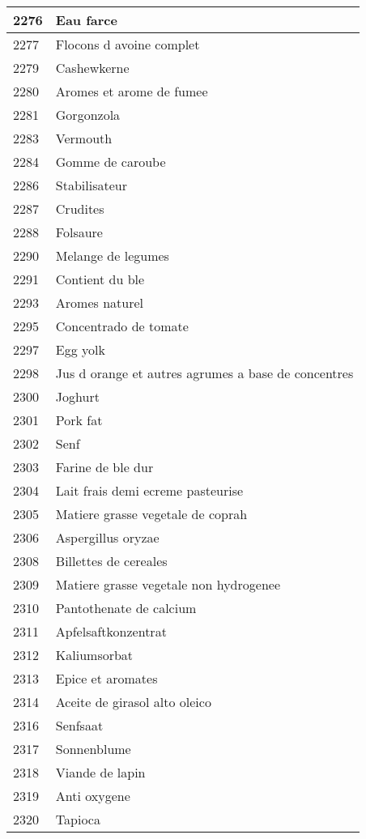 \begin{longtable}{|l|l|}
2276 & Eau farce \\ \hline 
2277 & Flocons d avoine complet \\ \hline 
2279 & Cashewkerne \\ \hline 
2280 & Aromes et arome de fumee \\ \hline 
2281 & Gorgonzola \\ \hline 
2283 & Vermouth \\ \hline 
2284 & Gomme de caroube \\ \hline 
2286 & Stabilisateur \\ \hline 
2287 & Crudites \\ \hline 
2288 & Folsaure \\ \hline 
2290 & Melange de legumes \\ \hline 
2291 & Contient du ble \\ \hline 
2293 & Aromes naturel \\ \hline 
2295 & Concentrado de tomate \\ \hline 
2297 & Egg yolk \\ \hline 
2298 & Jus d orange et autres agrumes a base de concentres \\ \hline 
2300 & Joghurt \\ \hline 
2301 & Pork fat \\ \hline 
2302 & Senf \\ \hline 
2303 & Farine de ble dur \\ \hline 
2304 & Lait frais demi ecreme pasteurise \\ \hline 
2305 & Matiere grasse vegetale de coprah \\ \hline 
2306 & Aspergillus oryzae \\ \hline 
2308 & Billettes de cereales \\ \hline 
2309 & Matiere grasse vegetale non hydrogenee \\ \hline 
2310 & Pantothenate de calcium \\ \hline 
2311 & Apfelsaftkonzentrat \\ \hline 
2312 & Kaliumsorbat \\ \hline 
2313 & Epice et aromates \\ \hline 
2314 & Aceite de girasol alto oleico \\ \hline 
2316 & Senfsaat \\ \hline 
2317 & Sonnenblume \\ \hline 
2318 & Viande de lapin \\ \hline 
2319 & Anti oxygene \\ \hline 
2320 & Tapioca \\ \hline 

\end{longtable}
